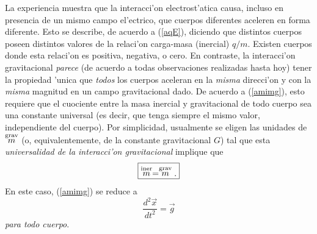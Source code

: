 La experiencia muestra que la interacci'on electrost'atica causa, incluso en presencia de un mismo campo el'ectrico, que cuerpos diferentes aceleren en forma diferente. Esto se describe, de acuerdo a (\ref{aqE}), diciendo que distintos cuerpos poseen distintos valores de la relaci'on carga-masa (inercial) $q/m$. Existen cuerpos donde esta relaci'on es positiva, negativa, o cero. En contraste, la interacci'on gravitacional \textit{parece} (de acuerdo a todas observaciones realizadas hasta hoy) tener la propiedad 'unica que \textit{todos} los cuerpos aceleran en la \textit{misma} direcci'on y con la \textit{misma} magnitud en un campo gravitacional dado. De acuerdo a (\ref{amimg}), esto requiere que el cuociente entre la masa inercial y gravitacional de todo cuerpo sea una constante universal (es decir, que tenga siempre el mismo valor, independiente del cuerpo). Por simplicidad, usualmente se eligen las unidades de $\stackrel{\rm grav}{m}$ (o, equivalentemente, de la constante gravitacional $G$) tal que esta \textit{universalidad de la interacci'on gravitacional} implique que
\begin{equation}
\boxed{\stackrel{\rm iner}{m}=\stackrel{\rm grav}{m}.}
\end{equation}
En este caso, (\ref{amimg}) se reduce a
\begin{equation}\label{ag}
\frac{d^2\vec{x}}{dt^2}=\vec{g}
\end{equation}
\textit{para todo cuerpo}.

